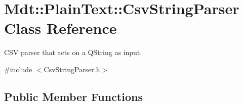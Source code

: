 \hypertarget{class_mdt_1_1_plain_text_1_1_csv_string_parser}{}\section{Mdt\+:\+:Plain\+Text\+:\+:Csv\+String\+Parser Class Reference}
\label{class_mdt_1_1_plain_text_1_1_csv_string_parser}


C\+SV parser that acts on a Q\+String as input.  




{\ttfamily \#include $<$Csv\+String\+Parser.\+h$>$}

\subsection*{Public Member Functions}
